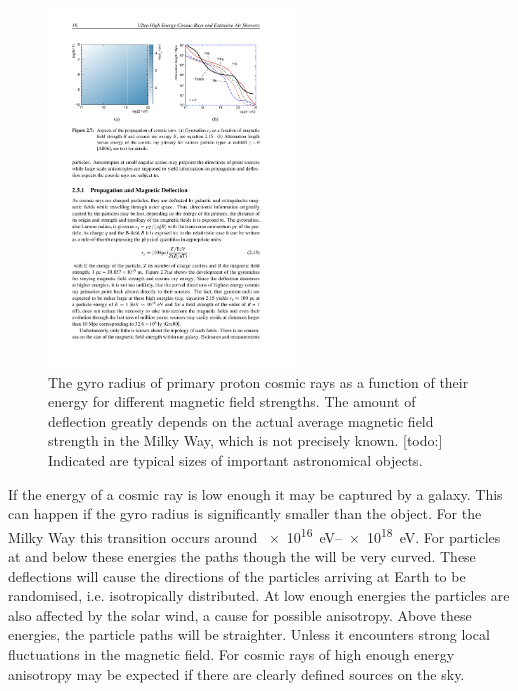 \begin{figure}
    \centering
    \includegraphics[width=0.6\textwidth]
                    {plots/cosmic-rays/gyroradius}
    \caption{The gyro radius of primary proton cosmic rays as a function of their energy for different magnetic field strengths. The amount of deflection greatly depends on the actual average magnetic field strength in the Milky Way, which is not precisely known. [todo:] Indicated are typical sizes of important astronomical objects.}
    \label{fig:gyroradius}
\end{figure}

If the energy of a cosmic ray is low enough it may be captured by a galaxy. This can happen if the gyro radius is significantly smaller than the object. For the Milky Way this transition occurs around \SIrange{e16}{e18}{\eV}. For particles at and below these energies the paths though the \ism will be very curved. These deflections will cause the directions of the particles arriving at Earth to be randomised, i.e. isotropically distributed. At low enough energies the particles are also affected by the solar wind, a cause for possible anisotropy. Above these energies, the particle paths will be straighter. Unless it encounters strong local fluctuations in the magnetic field. For cosmic rays of high enough energy anisotropy may be expected if there are clearly defined sources on the sky.

